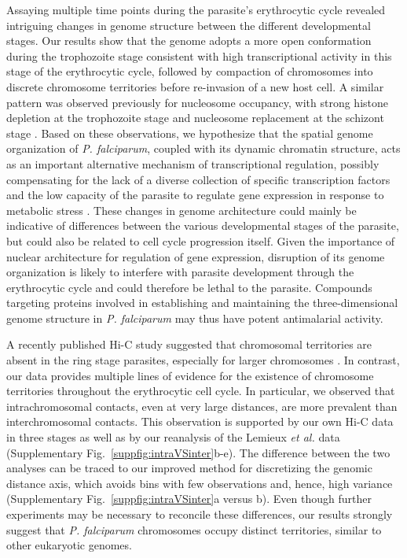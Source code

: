 Assaying multiple time points during the parasite's erythrocytic cycle revealed intriguing changes in genome structure between the different developmental stages. Our results show that the genome adopts a more open conformation during the trophozoite stage consistent with high transcriptional activity in this stage of the erythrocytic cycle, followed by compaction of chromosomes into discrete chromosome territories before re-invasion of a new host cell. A similar pattern was observed previously for nucleosome occupancy, with strong histone depletion at the trophozoite stage and nucleosome replacement at the schizont stage \citep{ponts:nucleosome}. Based on these observations, we hypothesize that the spatial genome organization of {\em P. falciparum}, coupled with its dynamic chromatin structure, acts as an important alternative mechanism of transcriptional regulation, possibly compensating for the lack of a diverse collection of specific transcription factors \citep{balaji:discovery, coulson:comparative} and the low capacity of the parasite to regulate gene expression in response to metabolic stress \citep{ganesan:genetically, leroch:systematic}. These changes in genome architecture could mainly be indicative of differences between the various developmental stages of the parasite, but could also be related to cell cycle progression itself. Given the importance of nuclear architecture for regulation of gene expression, disruption of its genome organization is likely to interfere with parasite development through the erythrocytic cycle and could therefore be lethal to the parasite. Compounds targeting proteins involved in establishing and maintaining the three-dimensional genome structure in {\em P. falciparum} may thus have potent antimalarial activity.

A recently published Hi-C study suggested that chromosomal territories are absent in the ring stage parasites, especially for larger chromosomes \citep{lemieux:genome-wide}. In contrast, our data provides multiple lines of evidence for the existence of chromosome territories throughout the erythrocytic cell cycle. In particular, we observed that intrachromosomal contacts, even at very large distances, are more prevalent than interchromosomal contacts. This observation is supported by our own Hi-C data in three stages as well as by our reanalysis of the Lemieux {\em et al.} data (Supplementary Fig.~\ref*{suppfig:intraVSinter}b-e). The difference between the two analyses can be traced to our improved method for discretizing the genomic distance axis, which avoids bins with few observations and, hence, high variance (Supplementary Fig.~\ref*{suppfig:intraVSinter}a versus b). Even though further experiments may be necessary to reconcile these differences, our results strongly suggest that {\em P. falciparum} chromosomes occupy distinct territories, similar to other eukaryotic genomes.


